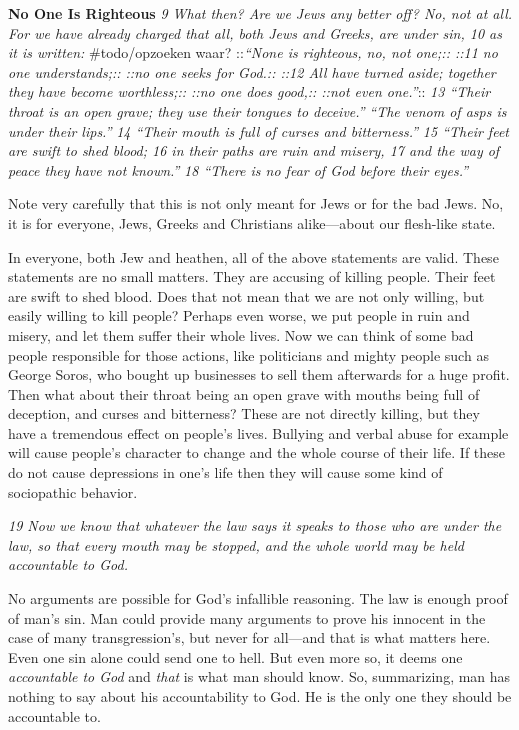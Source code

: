 \textbf{No One Is Righteous} \emph{9 What then? Are we Jews any better
off? No, not at all. For we have already charged that all, both Jews and
Greeks, are under sin, 10 as it is written:} \#todo/opzoeken waar?
::\emph{``None is righteous, no, not one;\emph{:: ::}11 no one
understands;\emph{:: ::}no one seeks for God.\emph{:: ::}12 All have
turned aside; together they have become worthless;\emph{:: ::}no one
does good,\emph{:: ::}not even one.''}:: \emph{13 ``Their throat is an
open grave;\emph{ }they use their tongues to deceive.''} \emph{``The
venom of asps is under their lips.''} \emph{14 ``Their mouth is full of
curses and bitterness.''} \emph{15 ``Their feet are swift to shed
blood;\emph{ }16 in their paths are ruin and misery,\emph{ }17 and the
way of peace they have not known.''} \emph{18 ``There is no fear of God
before their eyes.''}

Note very carefully that this is not only meant for Jews or for the bad
Jews. No, it is for everyone, Jews, Greeks and Christians alike---about
our flesh-like state.

In everyone, both Jew and heathen, all of the above statements are
valid. These statements are no small matters. They are accusing of
killing people. Their feet are swift to shed blood. Does that not mean
that we are not only willing, but easily willing to kill people? Perhaps
even worse, we put people in ruin and misery, and let them suffer their
whole lives. Now we can think of some bad people responsible for those
actions, like politicians and mighty people such as George Soros, who
bought up businesses to sell them afterwards for a huge profit. Then
what about their throat being an open grave with mouths being full of
deception, and curses and bitterness? These are not directly killing,
but they have a tremendous effect on people's lives. Bullying and verbal
abuse for example will cause people's character to change and the whole
course of their life. If these do not cause depressions in one's life
then they will cause some kind of sociopathic behavior.

\emph{19 Now we know that whatever the law says it speaks to those who
are under the law, so that every mouth may be stopped, and the whole
world may be held accountable to God.}

No arguments are possible for God's infallible reasoning. The law is
enough proof of man's sin. Man could provide many arguments to prove his
innocent in the case of many transgression's, but never for all---and
that is what matters here. Even one sin alone could send one to hell.
But even more so, it deems one \emph{accountable to God} and \emph{that}
is what man should know. So, summarizing, man has nothing to say about
his accountability to God. He is the only one they should be accountable
to.


